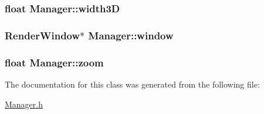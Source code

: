 \subsubsection[{\texorpdfstring{width3D}{width3D}}]{\setlength{\rightskip}{0pt plus 5cm}float Manager\+::width3D\hspace{0.3cm}{\ttfamily [private]}}\hypertarget{classManager_a6135e1c40a71a1bdbbbab15c84614de2}{}\label{classManager_a6135e1c40a71a1bdbbbab15c84614de2}
\subsubsection[{\texorpdfstring{window}{window}}]{\setlength{\rightskip}{0pt plus 5cm}Render\+Window$\ast$ Manager\+::window\hspace{0.3cm}{\ttfamily [private]}}\hypertarget{classManager_a1ba39cb3b48db43ac88983af62d29ceb}{}\label{classManager_a1ba39cb3b48db43ac88983af62d29ceb}
\subsubsection[{\texorpdfstring{zoom}{zoom}}]{\setlength{\rightskip}{0pt plus 5cm}float Manager\+::zoom\hspace{0.3cm}{\ttfamily [private]}}\hypertarget{classManager_a39946012d45458a913d1c1a4604be337}{}\label{classManager_a39946012d45458a913d1c1a4604be337}


The documentation for this class was generated from the following file\+:\begin{DoxyCompactItemize}
\item 
\hyperlink{Manager_8h}{Manager.\+h}\end{DoxyCompactItemize}
